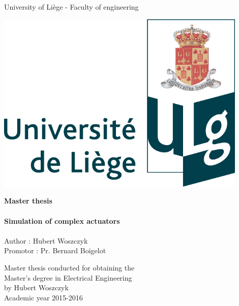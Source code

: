 \begin{titlepage}


\begin{center}
\large
University of Liège - Faculty of engineering
\end{center}

\vfill

\begin{minipage}{0.5\textwidth}
\includegraphics[width=0.9\textwidth]{figures/ULg_logo_couleur.pdf}
\end{minipage}
\begin{minipage}{0.5\textwidth}
\huge
\textbf{Master thesis}\\\\
\normalsize
\textbf{Simulation of complex actuators}\\\\
Author : Hubert Woszczyk\\
Promotor : Pr. Bernard Boigelot\\
\end{minipage}

\vfill
\begin{center}
\large
Master thesis conducted for obtaining the\\ Master's degree in Electrical Engineering\\ by Hubert Woszczyk\\
\vspace*{8cm}
\normalsize
Academic year 2015-2016
\end{center}

\end{titlepage}

\newpage\null\thispagestyle{empty}\newpage

